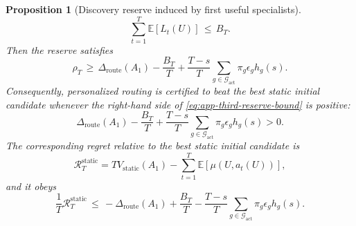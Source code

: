 \documentclass{article} %
\newtheorem{proposition}[theorem]{Proposition}
\begin{document}
\begin{proposition}[Discovery reserve induced by first useful specialists]
\begin{equation}
\label{eq:app-third-reserve-tax}
\sum_{t=1}^{T}
\mathbb{E}[L_t(U)]
\,\le\,
B_T.
\end{equation}
Then the reserve satisfies
\begin{equation}
\label{eq:app-third-reserve-bound}
\rho_T
\,\ge\,
\Delta_{\mathrm{route}}(A_1)
-
\frac{B_T}{T}
+
\frac{T-s}{T}
\sum_{g\in\mathcal{G}_{\mathrm{act}}}
\pi_g
\epsilon_g
h_g(s).
\end{equation}
Consequently, personalized routing is certified to beat the best static initial candidate whenever the right-hand side of \eqref{eq:app-third-reserve-bound} is positive:
\begin{equation}
\label{eq:app-third-reserve-positive}
\Delta_{\mathrm{route}}(A_1)
-
\frac{B_T}{T}
+
\frac{T-s}{T}
\sum_{g\in\mathcal{G}_{\mathrm{act}}}
\pi_g
\epsilon_g
h_g(s)
>
0.
\end{equation}
The corresponding regret relative to the best static initial candidate is
\begin{equation}
\label{eq:app-third-static-regret}
\mathcal{R}_{T}^{\mathrm{static}}
=
T V_{\mathrm{static}}(A_1)
-
\sum_{t=1}^{T}
\mathbb{E}[\mu(U,a_t(U))],
\end{equation}
and it obeys
\begin{equation}
\label{eq:app-third-static-regret-bound}
\frac{1}{T}
\mathcal{R}_{T}^{\mathrm{static}}
\,\le\,
-
\Delta_{\mathrm{route}}(A_1)
+
\frac{B_T}{T}
-
\frac{T-s}{T}
\sum_{g\in\mathcal{G}_{\mathrm{act}}}
\pi_g
\epsilon_g
h_g(s).
\end{equation}
\end{proposition}
\end{document}
